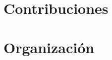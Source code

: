 \section{Contribuciones}
\label{sec:intro.contribuciones}



\section{Organizaci\'on}
\label{sec:intro.organizacion}



